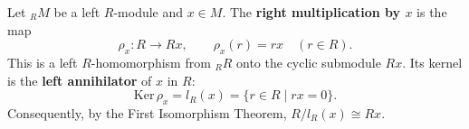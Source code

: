 Let ${}_R M$ be a left $R$-module and $x \in M$. The \textbf{right multiplication by $x$} is the map
$$\rho_x: R \to Rx, \qquad \rho_x(r) = rx \quad (r \in R).$$
This is a left $R$-homomorphism from ${}_R R$ onto the cyclic submodule $Rx$. Its kernel is the \textbf{left annihilator} of $x$ in $R$:
$$\text{Ker}\, \rho_x = l_R(x) = \{r \in R \mid rx = 0\}.$$
Consequently, by the First Isomorphism Theorem, $R / l_R(x) \cong Rx$.
